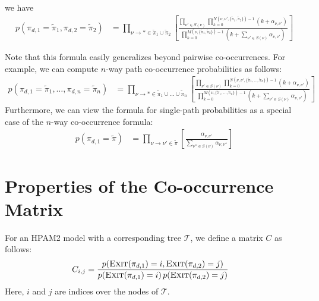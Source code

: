 \documentclass{article}
\theoremstyle{definition}
\newcommand{\Exit}{\textsc{Exit}}
\begin{document}
we have
\begin{align}
p(\pi_{d,1} = \tilde\pi_1, \pi_{d,2} = \tilde\pi_2)
&=
\prod_{\nu \to * \in \tilde\pi_1 \cup \tilde\pi_2}
\left[
\frac
  {
    \prod_{\nu' \in S(\nu)}
    \prod_{k=0}^{N(\nu,\nu',\{\tilde\pi_1,\tilde\pi_2\}) - 1}
    (k + \alpha_{\nu,\nu'})
  }
  {
    \prod_{k=0}^{M(\nu,\{\tilde\pi_1,\tilde\pi_2\}) - 1}
    \left(
      k + \sum_{\nu' \in S(\nu)}\alpha_{\nu,\nu'}
    \right)
  }
\right]
\label{eqn:pairPathProb}
\end{align}

Note that this formula easily generalizes beyond pairwise co-occurrences.
For example, we can compute $n$-way path co-occurrence probabilities as follows:
\begin{align}
p(\pi_{d,1} = \tilde\pi_1, \ldots, \pi_{d,n} = \tilde\pi_n)
&=
\prod_{\nu \to * \in \tilde\pi_1 \cup \ldots \cup \tilde\pi_n}
\left[
\frac
  {
    \prod_{\nu' \in S(\nu)}
    \prod_{k=0}^{N(\nu,\nu',\{\tilde\pi_1,\ldots,\tilde\pi_n\}) - 1}
    (k + \alpha_{\nu,\nu'})
  }
  {
    \prod_{k=0}^{M(\nu,\{\tilde\pi_1,\ldots,\tilde\pi_n\}) - 1}
    \left(
      k + \sum_{\nu' \in S(\nu)}\alpha_{\nu,\nu'}
    \right)
  }
\right]
\label{eqn:manyPathProb}
\end{align}
Furthermore, we can view the formula for single-path probabilities as a special case of the $n$-way co-occurrence formula:
\begin{align}
p(\pi_{d,1} = \tilde\pi)
&=
\prod_{\nu \to \nu' \in \tilde\pi}
\left[
\frac
  {
    \alpha_{\nu,\nu'}
  }
  {
    \sum_{\nu'' \in S(\nu)}\alpha_{\nu,\nu''}
  }
\right]
\label{eqn:singlePathProb}
\end{align}

\section{Properties of the Co-occurrence Matrix}

For an HPAM2 model with a corresponding tree $\mathcal T$, we define a matrix $C$ as follows:
\begin{align}
C_{i,j} &= \frac{p(\Exit(\pi_{d,1}) = i, \Exit(\pi_{d,2}) = j)}
                {p(\Exit(\pi_{d,1}) = i) \, p(\Exit(\pi_{d,2}) = j)}
\end{align}
Here, $i$ and $j$ are indices over the nodes of $\mathcal T$.
\end{document}
